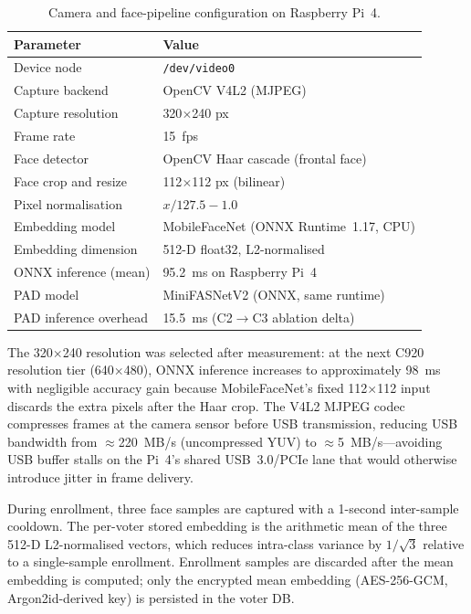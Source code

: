 \documentclass[conference]{IEEEtran}
\begin{document}
\begin{table}[t]
\centering
\caption{Camera and face-pipeline configuration on Raspberry Pi~4.}
\label{tab:camera_config}
\begin{tabular}{ll}
  \toprule
  Parameter & Value \\
  \midrule
  Device node             & \texttt{/dev/video0} \\
  Capture backend         & OpenCV V4L2 (MJPEG) \\
  Capture resolution      & 320$\times$240 px \\
  Frame rate              & 15~fps \\
  Face detector           & OpenCV Haar cascade (frontal face) \\
  Face crop and resize    & 112$\times$112 px (bilinear) \\
  Pixel normalisation     & $x/127.5 - 1.0$ \\
  Embedding model         & MobileFaceNet (ONNX Runtime~1.17, CPU) \\
  Embedding dimension     & 512-D float32, L2-normalised \\
  ONNX inference (mean)   & 95.2~ms on Raspberry Pi~4 \\
  PAD model               & MiniFASNetV2 (ONNX, same runtime) \\
  PAD inference overhead  & 15.5~ms (C2$\to$C3 ablation delta) \\
  \bottomrule
\end{tabular}
\end{table}

The 320$\times$240 resolution was selected after measurement: at the next
C920 resolution tier (640$\times$480), ONNX inference increases to
approximately 98~ms with negligible accuracy gain because MobileFaceNet's
fixed 112$\times$112 input discards the extra pixels after the Haar crop.
The V4L2 MJPEG codec compresses frames at the camera sensor before USB
transmission, reducing USB bandwidth from $\approx$220~MB/s (uncompressed
YUV) to $\approx$5~MB/s—avoiding USB buffer stalls on the Pi~4's shared
USB~3.0/PCIe lane that would otherwise introduce jitter in frame delivery.

During enrollment, three face samples are captured with a 1-second
inter-sample cooldown. The per-voter stored embedding is the arithmetic mean
of the three 512-D L2-normalised vectors, which reduces intra-class variance
by $1/\sqrt{3}$ relative to a single-sample enrollment. Enrollment samples
are discarded after the mean embedding is computed; only the encrypted mean
embedding (AES-256-GCM, Argon2id-derived key) is persisted in the voter DB.
\end{document}
